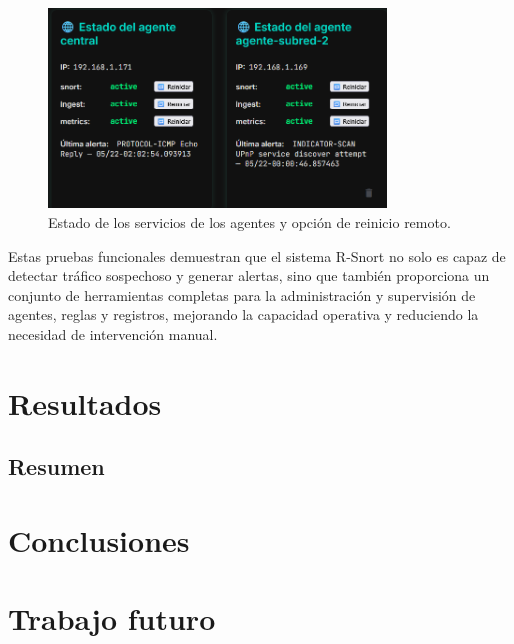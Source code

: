 \documentclass[11pt,a4paper,twoside]{report}
\begin{document}
\begin{figure}[H]
	\centering
	\includegraphics[width=0.8\textwidth]{pruebas/9.png}
	\caption{Estado de los servicios de los agentes y opción de reinicio remoto.}
	\label{fig:estado_servicios_agentes}
\end{figure}

Estas pruebas funcionales demuestran que el sistema R-Snort no solo es capaz de detectar tráfico sospechoso y generar alertas, sino que también proporciona un conjunto de herramientas completas para la administración y supervisión de agentes, reglas y registros, mejorando la capacidad operativa y reduciendo la necesidad de intervención manual.



\clearpage
\null
\thispagestyle{empty}
\newpage
\chapter{Resultados}

\section{Resumen}


\clearpage
\null
\thispagestyle{empty}
\newpage
\thispagestyle{empty}
\chapter*{Conclusiones}


\clearpage
\null
\thispagestyle{empty}
\newpage
\chapter*{Trabajo futuro}

\cleardoublepage %
\end{document}
